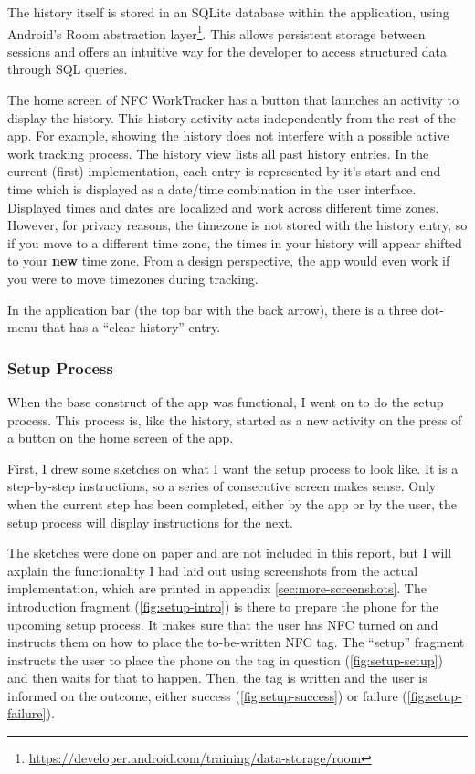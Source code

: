 \documentclass[conference]{IEEEtran}
\newcommand{\projectname}{NFC WorkTracker}
\begin{document}
The history itself is stored in an SQLite database within the application, using Android's Room abstraction layer\footnote{\url{https://developer.android.com/training/data-storage/room}}. This allows persistent storage between sessions and offers an intuitive way for the developer to access structured data through SQL queries.

The home screen of \projectname{} has a button that launches an activity to display the history. This history-activity acts independently from the rest of the app. For example, showing the history does not interfere with a possible active work tracking process. The history view lists all past history entries. In the current (first) implementation, each entry is represented by it's start and end time which is displayed as a date/time combination in the user interface. Displayed times and dates are localized and work across different time zones. However, for privacy reasons, the timezone is not stored with the history entry, so if you move to a different time zone, the times in your history will appear shifted to your \textbf{new} time zone. From a design perspective, the app would even work if you were to move timezones during tracking.

In the application bar (the top bar with the back arrow), there is a three dot-menu that has a ``clear history'' entry.

\subsubsection{Setup Process}
When the base construct of the app was functional, I went on to do the setup process. This process is, like the history, started as a new activity on the press of a button on the home screen of the app.

First, I drew some sketches on what I want the setup process to look like. It is a step-by-step instructions, so a series of consecutive screen makes sense. Only when the current step has been completed, either by the app or by the user, the setup process will display instructions for the next.

The sketches were done on paper and are not included in this report, but I will axplain the functionality I had laid out using screenshots from the actual implementation, which are printed in appendix \ref{sec:more-screenshots}.
The introduction fragment (\cref{fig:setup-intro}) is there to prepare the phone for the upcoming setup process. It makes sure that the user has NFC turned on and instructs them on how to place the to-be-written NFC tag. The ``setup'' fragment instructs the user to place the phone on the tag in question (\cref{fig:setup-setup}) and then waits for that to happen. Then, the tag is written and the user is informed on the outcome, either success (\cref{fig:setup-success}) or failure (\cref{fig:setup-failure}).
\end{document}
